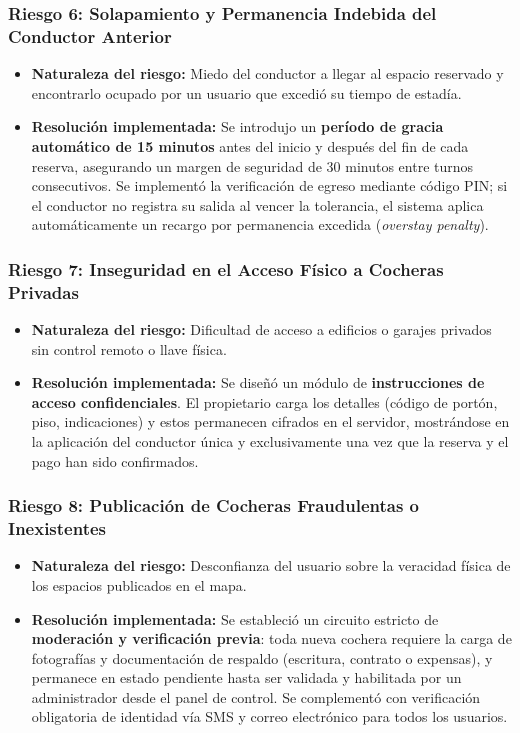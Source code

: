 \subsubsection{Riesgo 6: Solapamiento y Permanencia Indebida del Conductor Anterior}
\begin{itemize}
    \item \textbf{Naturaleza del riesgo:} Miedo del conductor a llegar al espacio reservado y encontrarlo ocupado por un usuario que excedió su tiempo de estadía.
    \item \textbf{Resolución implementada:} Se introdujo un \textbf{período de gracia automático de 15 minutos} antes del inicio y después del fin de cada reserva, asegurando un margen de seguridad de 30 minutos entre turnos consecutivos. Se implementó la verificación de egreso mediante código PIN; si el conductor no registra su salida al vencer la tolerancia, el sistema aplica automáticamente un recargo por permanencia excedida (\textit{overstay penalty}).
\end{itemize}

\subsubsection{Riesgo 7: Inseguridad en el Acceso Físico a Cocheras Privadas}
\begin{itemize}
    \item \textbf{Naturaleza del riesgo:} Dificultad de acceso a edificios o garajes privados sin control remoto o llave física.
    \item \textbf{Resolución implementada:} Se diseñó un módulo de \textbf{instrucciones de acceso confidenciales}. El propietario carga los detalles (código de portón, piso, indicaciones) y estos permanecen cifrados en el servidor, mostrándose en la aplicación del conductor única y exclusivamente una vez que la reserva y el pago han sido confirmados.
\end{itemize}

\subsubsection{Riesgo 8: Publicación de Cocheras Fraudulentas o Inexistentes}
\begin{itemize}
    \item \textbf{Naturaleza del riesgo:} Desconfianza del usuario sobre la veracidad física de los espacios publicados en el mapa.
    \item \textbf{Resolución implementada:} Se estableció un circuito estricto de \textbf{moderación y verificación previa}: toda nueva cochera requiere la carga de fotografías y documentación de respaldo (escritura, contrato o expensas), y permanece en estado pendiente hasta ser validada y habilitada por un administrador desde el panel de control. Se complementó con verificación obligatoria de identidad vía SMS y correo electrónico para todos los usuarios.
\end{itemize}


